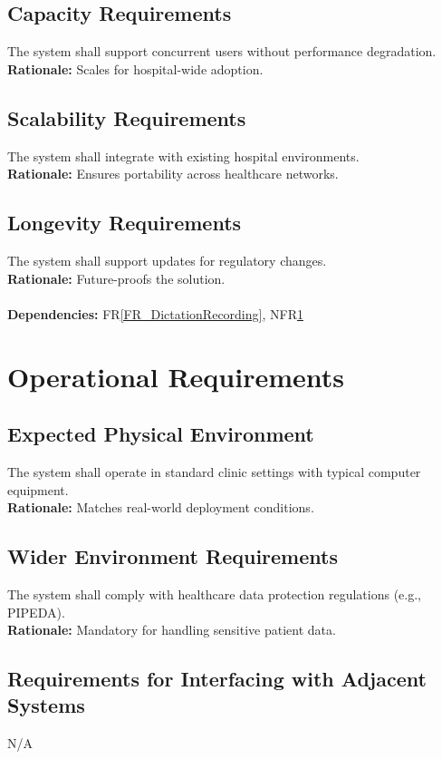 \documentclass[12pt]{article}
\begin{document}
\begin{itemize}
\subsection{Capacity Requirements}
The system shall support concurrent users without performance degradation.  \\
\textbf{Rationale:} Scales for hospital-wide adoption.

\subsection{Scalability Requirements}
The system shall integrate with existing hospital environments.  \\
\textbf{Rationale:} Ensures portability across healthcare networks.

\subsection{Longevity Requirements}
The system shall support updates for regulatory changes.  \\
\textbf{Rationale:} Future-proofs the solution. \\
  \\
\textbf{Dependencies:} FR\ref{FR_DictationRecording}, NFR\ref{NFR_Operational}

\section{Operational Requirements} \label{NFR_Operational}
\subsection{Expected Physical Environment}
The system shall operate in standard clinic settings with typical computer equipment.  \\
\textbf{Rationale:} Matches real-world deployment conditions.

\subsection{Wider Environment Requirements}
The system shall comply with healthcare data protection regulations (e.g., PIPEDA).  \\
\textbf{Rationale:} Mandatory for handling sensitive patient data.

\subsection{Requirements for Interfacing with Adjacent Systems}
N/A


\end{itemize}
\end{document}
